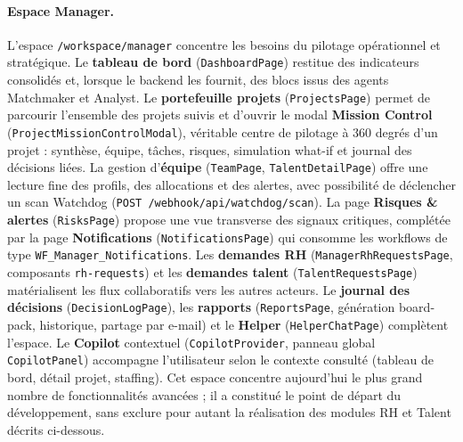 \paragraph{Espace Manager.}
L'espace \texttt{/workspace/manager} concentre les besoins du pilotage opérationnel et stratégique. Le \textbf{tableau de bord} (\texttt{DashboardPage}) restitue des indicateurs consolidés et, lorsque le backend les fournit, des blocs issus des agents Matchmaker et Analyst. Le \textbf{portefeuille projets} (\texttt{ProjectsPage}) permet de parcourir l'ensemble des projets suivis et d'ouvrir le modal \textbf{Mission Control} (\texttt{ProjectMissionControlModal}), véritable centre de pilotage à 360 degrés d'un projet : synthèse, équipe, tâches, risques, simulation what-if et journal des décisions liées. La gestion d'\textbf{équipe} (\texttt{TeamPage}, \texttt{TalentDetailPage}) offre une lecture fine des profils, des allocations et des alertes, avec possibilité de déclencher un scan Watchdog (\texttt{POST /webhook/api/watchdog/scan}). La page \textbf{Risques \& alertes} (\texttt{RisksPage}) propose une vue transverse des signaux critiques, complétée par la page \textbf{Notifications} (\texttt{NotificationsPage}) qui consomme les workflows de type \texttt{WF\_Manager\_Notifications}. Les \textbf{demandes RH} (\texttt{ManagerRhRequestsPage}, composants \texttt{rh-requests}) et les \textbf{demandes talent} (\texttt{TalentRequestsPage}) matérialisent les flux collaboratifs vers les autres acteurs. Le \textbf{journal des décisions} (\texttt{DecisionLogPage}), les \textbf{rapports} (\texttt{ReportsPage}, génération board-pack, historique, partage par e-mail) et le \textbf{Helper} (\texttt{HelperChatPage}) complètent l'espace. Le \textbf{Copilot} contextuel (\texttt{CopilotProvider}, panneau global \texttt{CopilotPanel}) accompagne l'utilisateur selon le contexte consulté (tableau de bord, détail projet, staffing). Cet espace concentre aujourd'hui le plus grand nombre de fonctionnalités avancées ; il a constitué le point de départ du développement, sans exclure pour autant la réalisation des modules RH et Talent décrits ci-dessous.

